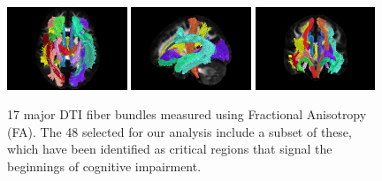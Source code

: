 \begin{figure}
\centering
  \includegraphics[width=0.32\textwidth]{3_covtraj/figs/majorDTI_FA/screenshot0001.png}
  \includegraphics[width=0.32\textwidth]{3_covtraj/figs/majorDTI_FA/screenshot0002.png}
  \includegraphics[width=0.32\textwidth]{3_covtraj/figs/majorDTI_FA/screenshot0003.png}
  \caption[Major DTI fiber bundles]{\label{fig:majorDTI}17 major DTI fiber bundles measured using Fractional Anisotropy (FA). The 48 selected for our analysis include a subset of these, which have been identified as critical regions that signal the beginnings of cognitive impairment.}
\end{figure}

\newpage

